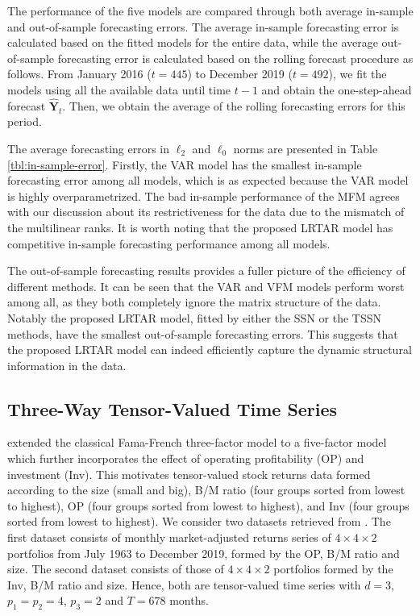 \documentclass[12pt]{article}
\newcommand{\bm}{\boldsymbol}
\begin{document}
The performance of the five models  are compared through both average in-sample and out-of-sample forecasting errors.  The average in-sample forecasting error is calculated based on the fitted models for the entire data, while the average out-of-sample forecasting error is calculated based on the rolling forecast procedure as follows. From January 2016 ($t=445$) to December 2019 ($t=492$), we fit the models using all the available data until time $t-1$ and obtain the one-step-ahead forecast $\bm{\widehat{Y}}_t$. Then, we obtain the average of the rolling forecasting errors for this period.


The average forecasting errors in $\ell_2$ and $\ell_0$ norms are presented in Table \ref{tbl:in-sample-error}. Firstly, the VAR model has the smallest in-sample forecasting error among all models, which is as expected because the VAR model is highly overparametrized. The bad in-sample performance of the MFM agrees with our discussion about its restrictiveness for the data due to the mismatch of the multilinear ranks. It is worth noting that the proposed LRTAR model has competitive in-sample forecasting performance among all models.  

The out-of-sample forecasting results provides a fuller picture of the efficiency of different methods. It can be seen that the VAR and VFM models perform worst among all, as they both completely ignore the matrix structure of the data. Notably the proposed LRTAR model, fitted by either the SSN or the TSSN methods, have the smallest out-of-sample forecasting errors. This suggests that the proposed LRTAR model can indeed efficiently capture the dynamic structural  information in the data.


\subsection{Three-Way Tensor-Valued Time Series \label{subsec:tensor_valued}}
\cite{fama2015five} extended the classical Fama-French three-factor model to a five-factor model which further incorporates the effect of  operating profitability (OP) and investment (Inv). This motivates tensor-valued stock returns data formed according to the size (small and big), B/M ratio (four groups sorted from lowest to highest), OP (four groups sorted from lowest to highest), and Inv (four groups sorted from lowest to highest). We consider two datasets retrieved from \cite{French_data}.
The first dataset consists of monthly market-adjusted returns series of $4\times 4\times 2$ portfolios  from July 1963 to December 2019, formed by the OP, B/M ratio and size. The second dataset consists of those of $4\times 4\times 2$ portfolios formed by the Inv, B/M ratio and size. Hence, both are tensor-valued time series with $d=3$, $p_1=p_2=4$, $p_3=2$ and $T=678$ months. 
\end{document}
